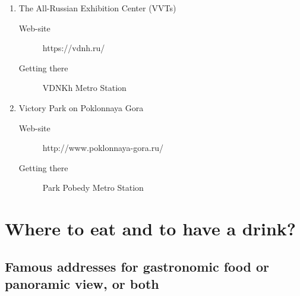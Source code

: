\documentclass[10pt,fleqn,openany]{book} %
\begin{document}
\begin{enumerate}
	\item The All-Russian Exhibition Center (VVTs)
		\begin{description}
			\item[Web-site] https://vdnh.ru/ 
			\item[Getting there] VDNKh Metro Station
		\end{description}

	\item Victory Park on Poklonnaya Gora
		\begin{description}
			\item[Web-site] http://www.poklonnaya-gora.ru/ 
			\item[Getting there] Park Pobedy Metro Station
		\end{description}
		
\end{enumerate}

\section{Where to eat and to have a drink?}

\subsection{Famous addresses for gastronomic food or panoramic view, or both}
\end{document}
